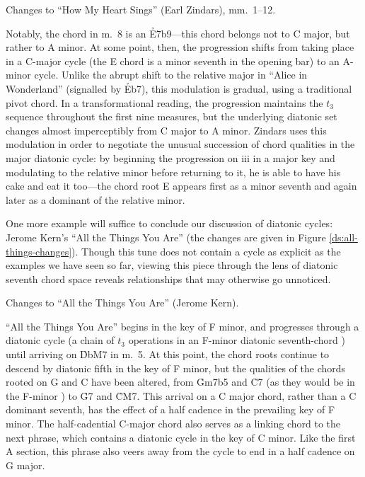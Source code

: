 \documentclass[diss]{subfiles}
\begin{document}
\figBeg[htbp]
  \caption{Changes to “How My Heart Sings” (Earl Zindars), mm.~1--12.}
  \label{ds:heart-sings-changes}
\figEnd

Notably, the chord in m.~8 is an \h{E7b9}---this chord belongs not to C major,
but rather to A minor. At some point, then, the progression shifts from taking
place in a C-major cycle (the E chord is a minor seventh in the opening bar)
to an A-minor cycle. Unlike the abrupt shift to the relative major in “Alice
in Wonderland” (signalled by \h{Eb7}), this modulation is gradual, using a
traditional pivot chord. In a transformational reading, the
progression maintains the $t_3$ sequence throughout the first nine measures,
but the underlying diatonic set changes almost imperceptibly from C major to A
minor. Zindars uses this modulation in order to negotiate the unusual
succession of chord qualities in the major diatonic cycle: by beginning the
progression on iii in a major key and modulating to the relative minor before
returning to it, he is able to have his cake and eat it too---the chord root E
appears first as a minor seventh and again later as a dominant of the relative
minor.

One more example will suffice to conclude our discussion of diatonic cycles:
Jerome Kern’s “All the Things You Are” (the changes are given in Figure
\ref{ds:all-things-changes}). Though this tune does not contain a
cycle as explicit as the examples we have seen so far, viewing this piece
through the lens of diatonic seventh chord space reveals relationships that may
otherwise go unnoticed.

\figBeg[htbp]
  \caption{Changes to “All the Things You Are” (Jerome Kern).}
  \label{ds:all-things-changes}
\figEnd

“All the Things You Are” begins in the key of F minor, and progresses through
a diatonic cycle (a chain of $t_3$ operations in an F-minor diatonic
seventh-chord \gis{}) until arriving on \h{DbM7} in m.~5. At this point, the
chord roots continue to descend by diatonic fifth in the key of F minor, but
the qualities of the chords rooted on G and C have been altered, from
\h{Gm7b5} and \h{C7} (as they would be in the F-minor \gis{}) to \h{G7} and
\h{CM7}. This arrival on a C major chord, rather than a C dominant seventh,
has the effect of a half cadence in the prevailing key of F minor. The
half-cadential C-major chord also serves as a linking chord to the next
phrase, which contains a diatonic cycle in the key of C minor. Like the first
A section, this phrase also veers away from the cycle to end in a half cadence
on G major.
\end{document}
